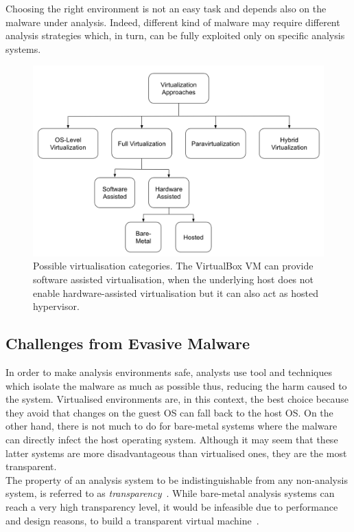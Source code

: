 \documentclass[LaM,binding=0.6cm]{sapthesis}
\begin{document}
Choosing the right environment is not an easy task and depends also on the malware under analysis. Indeed, different kind of malware may require different analysis strategies which, in turn, can be fully exploited only on specific analysis systems.
\begin{figure}[h!]
\centering
\includegraphics[scale=.5]{images/background4}
\caption{Possible virtualisation categories. The VirtualBox VM can provide software assisted virtualisation, when the underlying host does not enable hardware-assisted virtualisation but it can also act as hosted hypervisor.}
\end{figure}
\newpage
\subsection{Challenges from Evasive Malware}
\label{subsec:evasivemalware}
In order to make analysis environments safe, analysts use tool and techniques which isolate the malware as much as possible thus, reducing the harm caused to the system. Virtualised environments are, in this context, the best choice because they avoid that changes on the guest OS can fall back to the host OS. On the other hand, there is not much to do for bare-metal systems where the malware can directly infect the host operating system. Although it may seem that these latter systems are more disadvantageous than virtualised ones, they are the most transparent.\\
The property of an analysis system to be indistinguishable from any non-analysis system, is referred to as \textit{transparency}~\cite{bulazel2017survey}. While bare-metal analysis systems can reach a very high transparency level, it would be infeasible due to performance and design reasons, to build a transparent virtual machine~\cite{garfinkel2007compatibility}.\\
\end{document}
